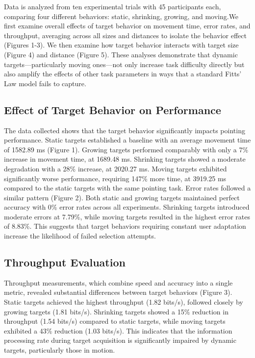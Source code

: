\documentclass[acmlarge]{acmart}
\begin{document}
Data is analyzed from ten experimental trials with 45 participants each, comparing four different behaviors: static, shrinking, growing, and moving.We first examine overall effects of target behavior on movement time, error rates, and throughput, averaging across all sizes and distances to isolate the behavior effect (Figures 1-3). We then examine how target behavior interacts with target size (Figure 4) and distance (Figure 5). These analyses demonstrate that dynamic targets—particularly moving ones—not only increase task difficulty directly but also amplify the effects of other task parameters in ways that a standard Fitts' Law model fails to capture.


\subsection{Effect of Target Behavior on Performance}

The data collected shows that the target behavior significantly impacts pointing performance. Static targets established a baseline with an average movement time of 1582.89 ms (Figure 1). Growing targets performed comparably with only a 7\% increase in movement time, at 1689.48 ms. Shrinking targets showed a moderate degradation with a 28\% increase, at 2020.27 ms. Moving targets exhibited significantly worse performance, requiring 147\% more time, at 3919.25 ms compared to the static targets with the same pointing task.
	Error rates followed a similar pattern (Figure 2). Both static and growing targets maintained perfect accuracy with 0\% error rates across all experiments. Shrinking targets introduced moderate errors at 7.79\%, while moving targets resulted in the highest error rates of 8.83\%. This suggests that target behaviors requiring constant user adaptation increase the likelihood of failed selection attempts. 

\subsection{Throughput Evaluation}
Throughput measurements, which combine speed and accuracy into a single metric, revealed substantial differences between target behaviors (Figure 3). Static targets achieved the highest throughput (1.82 bits/s), followed closely by growing targets (1.81 bits/s). Shrinking targets showed a 15\% reduction in throughput (1.54 bits/s) compared to static targets, while moving targets exhibited a 43\% reduction (1.03 bits/s). This indicates that the information processing rate during target acquisition is significantly impaired by dynamic targets, particularly those in motion.
\end{document}
